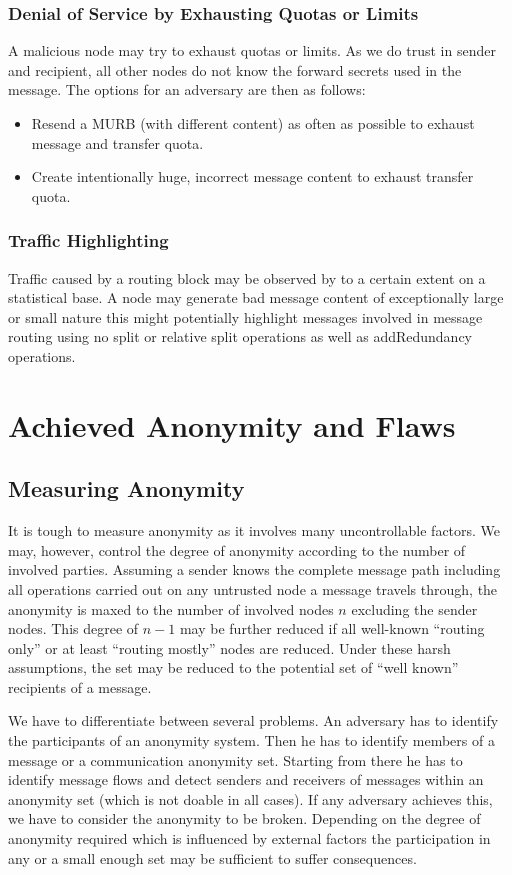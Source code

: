 \subsubsection{Denial of Service by Exhausting Quotas or Limits}
A malicious node may try to exhaust quotas or limits. As we do trust in sender and recipient, all other nodes do not know the forward secrets used in the message. The options for an adversary are then as follows:

\begin{itemize}
	\item Resend a MURB (with different content) as often as possible to exhaust message and transfer quota.
	\item Create intentionally huge, incorrect message content to exhaust transfer quota.
\end{itemize}

\subsubsection{Traffic Highlighting}
Traffic caused by a routing block may be observed by to a certain extent on a statistical base. A node may generate bad message content of exceptionally large or small nature this might potentially highlight messages involved in message routing using no split or relative split operations as well as addRedundancy operations.

\section{Achieved Anonymity and Flaws}
\subsection{Measuring Anonymity}
It is tough to measure anonymity as it involves many uncontrollable factors. We may, however, control the degree of anonymity according to the number of involved parties. Assuming a sender knows the complete message path including all operations carried out on any untrusted node a message travels through, the anonymity is maxed to the number of involved nodes $n$ excluding the sender nodes. This degree of $n-1$ may be further reduced if all well-known ``routing only'' or at least ``routing mostly'' nodes are reduced. Under these harsh assumptions, the set may be reduced to the potential set of ``well known'' recipients of a message.

We have to differentiate between several problems. An adversary has to identify the participants of an anonymity system. Then he has to identify members of a message or a communication anonymity set. Starting from there he has to identify message flows and detect senders and receivers of messages within an anonymity set (which is not doable in all cases). If any adversary achieves this, we have to consider the anonymity to be broken. Depending on the degree of anonymity required which is influenced by external factors the participation in any or a small enough set may be sufficient to suffer consequences.


